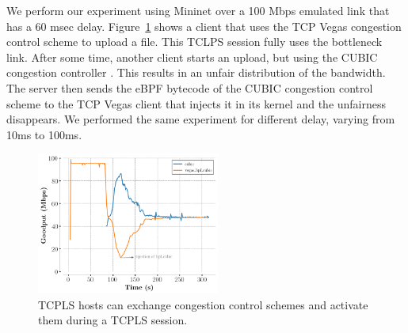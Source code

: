 We perform our experiment using Mininet over a 100 Mbps emulated link that has a 60 msec delay. Figure~\ref{fig:vegasCubic} shows a client that uses the TCP Vegas \cite{10.1145/190314.190317} congestion control scheme to upload a file. This TCLPS session fully uses the bottleneck link. After some time, another client starts an upload, but using the CUBIC congestion controller \cite{rfc8312}. This results in an unfair distribution of the bandwidth. The server then sends the eBPF bytecode of the CUBIC congestion control scheme to the TCP Vegas client that injects it in its kernel and the unfairness disappears.  We performed the same experiment for different delay, varying from 10ms to 100ms. 

\begin{figure}[!t]
  \begin{center}
    \includegraphics[width=6cm]{pretty_plotify/plots/vegas_cubic.png}
  \end{center}
  \caption{TCPLS hosts can exchange congestion control schemes and activate them during a TCPLS session.}
  \label{fig:vegasCubic}
\end{figure}
